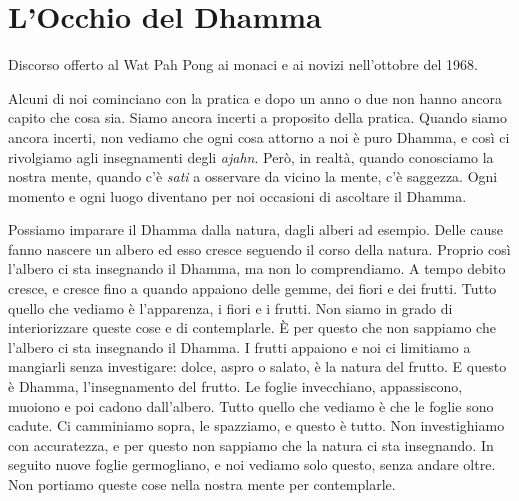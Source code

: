 \chapter{L'Occhio del Dhamma}

\begin{openingQuote}
  Discorso offerto al Wat Pah Pong ai monaci e ai novizi nell'ottobre del 1968.
\end{openingQuote}

Alcuni di noi cominciano con la pratica e dopo un anno o due non hanno
ancora capito che cosa sia. Siamo ancora incerti a proposito della
pratica. Quando siamo ancora incerti, non vediamo che ogni cosa attorno
a noi è puro Dhamma, e così ci rivolgiamo agli insegnamenti degli
\emph{ajahn}. Però, in realtà, quando conosciamo la nostra mente, quando
c'è \emph{sati} a osservare da vicino la mente, c'è saggezza. Ogni
momento e ogni luogo diventano per noi occasioni di ascoltare il Dhamma.

Possiamo imparare il Dhamma dalla natura, dagli alberi ad esempio. Delle
cause fanno nascere un albero ed esso cresce seguendo il corso della
natura. Proprio così l'albero ci sta insegnando il Dhamma, ma non lo
comprendiamo. A tempo debito cresce, e cresce fino a quando appaiono
delle gemme, dei fiori e dei frutti. Tutto quello che vediamo è
l'apparenza, i fiori e i frutti. Non siamo in grado di interiorizzare
queste cose e di contemplarle. È per questo che non sappiamo che
l'albero ci sta insegnando il Dhamma. I frutti appaiono e noi ci
limitiamo a mangiarli senza investigare: dolce, aspro o salato, è la
natura del frutto. E questo è Dhamma, l'insegnamento del frutto. Le
foglie invecchiano, appassiscono, muoiono e poi cadono dall'albero.
Tutto quello che vediamo è che le foglie sono cadute. Ci camminiamo
sopra, le spazziamo, e questo è tutto. Non investighiamo con
accuratezza, e per questo non sappiamo che la natura ci sta insegnando.
In seguito nuove foglie germogliano, e noi vediamo solo questo, senza
andare oltre. Non portiamo queste cose nella nostra mente per
contemplarle.

